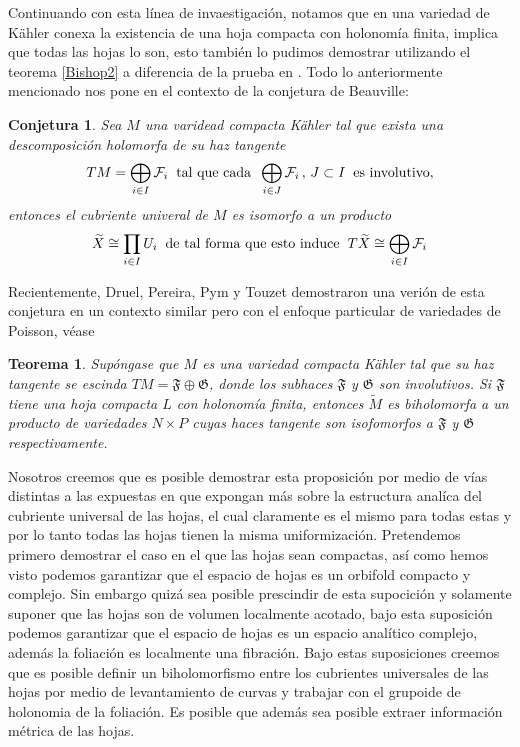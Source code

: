 \documentclass[letterpaper]{report}
\newtheorem{teorema}{Teorema}[chapter]
\newtheorem{conjetura}{Conjetura}
\begin{document}
Continuando con esta l\'inea de invaestigaci\'on, notamos que en una variedad de K\"ahler conexa la existencia de una hoja compacta 
con holonom\'ia finita, implica que todas las hojas lo son, esto tambi\'en lo pudimos demostrar utilizando el teorema \ref{Bishop2} a 
diferencia de la prueba en \cite{Pereira}. Todo lo anteriormente mencionado nos pone en el contexto de la conjetura de Beauville:
\begin{conjetura}
        Sea $M$ una varidead compacta K\"ahler tal que exista una descomposici\'on holomorfa de su haz tangente
        \[
        TM=\bigoplus_{i\in I}\mathcal{F}_i\hspace{0.2cm}\text{tal que cada}\hspace{0.2cm}\bigoplus_{i\in J}\mathcal{F}_i\,,\,J\subset I\hspace{0.2cm}\text{es involutivo},
        \]
        entonces el cubriente univeral de $M$ es isomorfo a un producto 
        \[
        \widetilde{X}\cong\prod_{i\in I}U_i\hspace{0.2cm}\text{de tal forma que esto induce}\hspace{0.2cm}T\widetilde{X}\cong\bigoplus_{i\in I}\mathcal{F}_i
        \]
\end{conjetura}
Recientemente, Druel, Pereira, Pym y Touzet demostraron una veri\'on de esta conjetura en un contexto similar pero con el enfoque
particular de variedades de Poisson, v\'ease \cite{DPPT}
\begin{teorema}
        Sup\'ongase que $M$ es una variedad compacta K\"ahler tal que su haz tangente se escinda $TM=\mathfrak{F}\oplus\mathfrak{G}$, donde
        los subhaces $\mathfrak{F}$ y $\mathfrak{G}$ son involutivos. Si $\mathfrak{F}$ tiene una hoja compacta $L$ con holonom\'ia finita,
        entonces $\widetilde{M}$ es biholomorfa a un producto de variedades $N\times P$ cuyas haces tangente son isofomorfos
        a $\mathfrak{F}$ y $\mathfrak{G}$ respectivamente.
\end{teorema}
\noindent Nosotros creemos que es posible demostrar esta proposici\'on por medio de v\'ias distintas a las expuestas en \cite{DPPT} que 
expongan m\'as sobre la estructura anal\'ica del cubriente universal de las hojas, el cual claramente es el mismo para todas estas
y por lo tanto todas las hojas tienen la misma uniformizaci\'on.
Pretendemos primero demostrar el caso en el que las hojas sean compactas, as\'i como hemos visto podemos garantizar que el espacio de
hojas es un orbifold compacto y complejo. Sin embargo quiz\'a sea posible prescindir de esta supocici\'on y solamente suponer que las hojas son
de volumen localmente acotado, bajo esta suposici\'on podemos garantizar que el espacio de hojas es un espacio anal\'itico complejo, adem\'as
la foliaci\'on es localmente una fibraci\'on. Bajo estas suposiciones creemos que es posible definir un biholomorfismo entre los cubrientes
universales de las hojas por medio de levantamiento de curvas y trabajar con el grupoide de holonomia de la foliaci\'on. Es posible que adem\'as
sea posible extraer informaci\'on m\'etrica de las hojas. 
\end{document}

